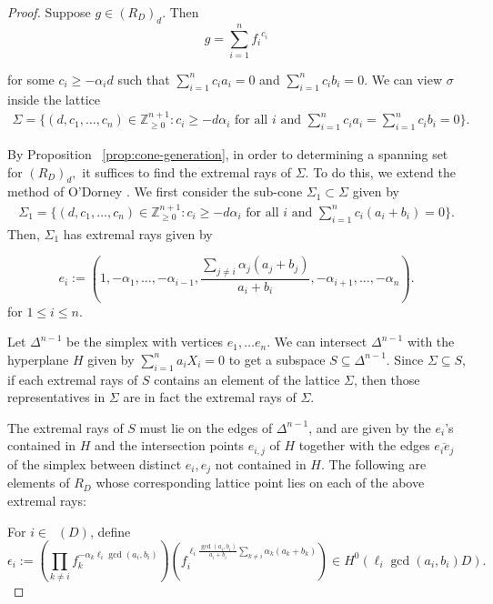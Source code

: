 \documentclass{amsart}
\theoremstyle{plain}
\theoremstyle{definition}
\theoremstyle{remark}
\numberwithin{equation}{section}
\newcommand\bz{{\mathbb Z}}
\newcommand\bida{a}
\newcommand\bidb{b}
\DeclareMathOperator{\Te}{T_=}
\begin{document}
\begin{proof}
Suppose $g
\in (R_D)_d$.
 Then 
\[
	g = \sum_{i = 1}^n {f_i}^{c_i}
\]

\noindent
for some $c_i \ge - \alpha_i d$ such that $\sum_{i=1}^n c_i \bida_i = 0$
and $\sum_{i=1}^n c_i \bidb_i = 0$. We can view $\sigma$ inside the
lattice 
\begin{align*}
	\Sigma = \{ (d, c_1, \ldots, c_n) \in \bz_{\geq 0}^{n+1} : c_i \ge - d
\alpha_i \text{ for all }i \text{ and }\sum_{i=1}^n c_i \bida_i = \sum_{i =
1}^n c_i \bidb_i = 0 \}.	
\end{align*}

By Proposition ~\ref{prop:cone-generation}, in order to determining a spanning
set for $(R_D)_d,$ it suffices to find the extremal rays of $\Sigma.$
To do this, we extend the method of O'Dorney \cite[Theorem 8]{dorney:canonical}. 
We first consider the sub-cone $\Sigma_1 \subset \Sigma$
given by
\begin{align*}
	\Sigma_1 = \{ (d, c_1, \ldots, c_n) \in \bz_{\geq 0}^{n+1} : c_i \ge -
d \alpha_i \text{ for all }i \text{ and }\sum_{i=1}^n c_i (\bida_i+\bidb_i) = 0
\}.	
\end{align*}
Then, $\Sigma_1$
has extremal rays given by
 
\[
	e_i := (1, -\alpha_1, \ldots, -\alpha_{i-1}, \frac{\sum_{j \ne i}
	\alpha_j (\bida_j + \bidb_j)}{\bida_i + \bidb_i}, -\alpha_{i + 1},
	\ldots, -\alpha_n).
\]
for $1 \leq i \leq n$.

Let $\Delta^{n-1}$ be the simplex with vertices $e_1, \ldots e_n$.
We can intersect $\Delta^{n-1}$ with the hyperplane $H$ given by
$\sum_{i=1}^n \bida_i X_i = 0$  to get a subspace $S \subseteq \Delta
^{n-1}$.  Since $\Sigma \subseteq S$, if each extremal rays of $S$ contains an element of the lattice $\Sigma$, then those representatives in $\Sigma$ are in fact the extremal rays of $\Sigma$.

The extremal rays of $S$ must lie on the edges of $\Delta
^{n - 1}$, 
and are given by the $e_i$'s
contained in $H$ and the intersection points $e_{i, j}$ of $H$
together with the edges $\overline{e_i e_j}$ of the simplex between
distinct $e_i, e_j$ not contained in $H$.
The following are elements of $R_D$ whose corresponding lattice point lies on each of the above extremal rays:

For $i \in \Te(D)$, define 
\begin{equation}\label{eqn:epsilon_i}
	\epsilon_i := (\prod_{k \ne i} f_k^{-\alpha_k \ell_i \gcd(\bida_i, \bidb_i)})
	(f_i^{\ell_i \frac{\gcd(\bida_i, \bidb_i)}{\bida_i + \bidb_i}\sum_{k \ne i}
	\alpha_k (\bida_k + \bidb_k)}) \in H^0(\ell_i \gcd(\bida_i, \bidb_i) D).
\end{equation}


\end{proof}
\end{document}
